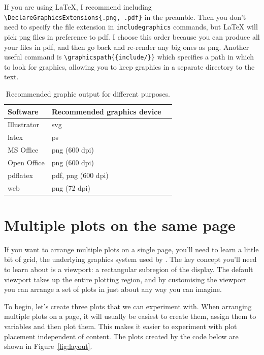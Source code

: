 If you are using \LaTeX, I recommend including \verb|\DeclareGraphicsExtensions{.png, .pdf}| in the preamble.  Then you don't need to specify the file extension in \verb|includegraphics| commands, but \LaTeX{} will pick png files in preference to pdf.  I choose this order because you can produce all your files in pdf, and then go back and re-render any big ones as png.  Another useful command is \verb|\graphicspath{{include/}}| which specifies a path in which to look for graphics, allowing you to keep graphics in a separate directory to the text.

\begin{table}
  \begin{center}
  \begin{tabular}{lll}
    \toprule
    Software & Recommended graphics device \\
    \midrule
    Illustrator & svg \\
    latex & ps \\
    MS Office & png (600 dpi) \\
    Open Office & png (600 dpi) \\
    pdflatex & pdf, png (600 dpi) \\
    web & png (72 dpi) \\
    \bottomrule 
  \end{tabular}
  \end{center}
  \caption{Recommended graphic output for different purposes.}
  \label{tbl:graphic-recommendation}
\end{table}

\section{Multiple plots on the same page}
\label{sec:grid-layout}

If you want to arrange multiple plots on a single page, you'll need to learn a little bit of grid, the underlying graphics system used by \ggplot. The key concept you'll need to learn about is a viewport: a rectangular subregion of the display. The default viewport takes up the entire plotting region, and by customising the viewport you can arrange a set of plots in just about any way you can imagine.

To begin, let's create three plots that we can experiment with. When arranging multiple plots on a page, it will usually be easiest to create them, assign them to variables and then plot them. This makes it easier to experiment with plot placement independent of content. The plots created by the code below are shown in Figure~\ref{fig:layout}.

